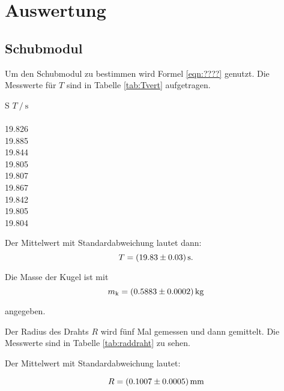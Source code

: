 \section{Auswertung}
\label{sec:Auswertung}

\subsection{Schubmodul}

Um den Schubmodul zu bestimmen wird Formel \eqref{eqn:????} genutzt.                  %
Die Messwerte für $T$ sind in Tabelle \ref{tab:Tvert} aufgetragen.

\begin{table}[h]
  \centering
  \caption{Messwerte der Periodendauern.}
  \label{tab:Tvert}
  \begin{tabular}{S}
    \toprule
    {$T\:/\:\si{\second}$} \\
     \\
    19.826 \\
    19.885 \\
    19.844 \\
    19.805 \\
    19.807 \\
    19.867 \\
    19.842 \\
    19.805 \\
    19.804 \\
    \bottomrule
  \end{tabular}
\end{table}

Der Mittelwert mit Standardabweichung lautet dann:
\begin{equation*}
  T = \SI{19.83 +- 0.03}{\second}.
\end{equation*}

Die Masse der Kugel ist mit
\begin{equation*}
  m_{\text{k}}= \SI{0.5883 +- 0.0002}{\kilogram}
\end{equation*}

angegeben.

Der Radius des Drahts $R$ wird fünf Mal gemessen und dann gemittelt.
Die Messwerte sind in Tabelle \ref{tab:raddraht} zu sehen.

Der Mittelwert mit Standardabweichung lautet:

\begin{equation*}
  R = \SI{0.1007 +- 0.0005}{\milli\meter}
\end{equation*}

